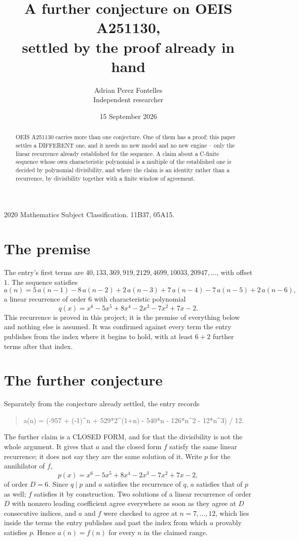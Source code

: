 \documentclass[11pt,a4paper]{article}
\title{A further conjecture on OEIS A251130,\\ \large settled by the proof already in hand}
\author{Adrian Perez Fontelles\\ \small Independent researcher}
\date{15 September 2026}
\theoremstyle{plain}
\theoremstyle{definition}
\begin{document}
\maketitle

\begin{abstract}
OEIS A251130 carries more than one conjecture. One of them has a proof; this paper settles a
DIFFERENT one, and it needs no new model and no new engine -- only the linear recurrence already
established for the sequence. A claim about a C-finite sequence whose own characteristic
polynomial is a multiple of the established one is decided by polynomial divisibility, and where
the claim is an identity rather than a recurrence, by divisibility together with a finite window
of agreement.
\end{abstract}

\noindent\small 2020 Mathematics Subject Classification. 11B37, 05A15.\normalsize

\section{The premise}

The entry's first terms are $40, 133, 369, 919, 2129, 4699, 10033, 20947,\dots$, with offset $1$. The sequence satisfies
\[
  a(n)=5\,a(n-1) - 8\,a(n-2) + 2\,a(n-3) + 7\,a(n-4) - 7\,a(n-5) + 2\,a(n-6) ,
\]
a linear recurrence of order $6$ with characteristic polynomial
\[
  q(x)=x^{6} - 5 x^{5} + 8 x^{4} - 2 x^{3} - 7 x^{2} + 7 x - 2 .
\]
This recurrence is proved in this project; it is the premise of everything below and nothing else is assumed.
It was confirmed against every term the entry publishes from the index where it begins to hold,
with at least $6+2$ further terms after that index.

\section{The further conjecture}

Separately from the conjecture already settled, the entry records

\begin{quote}\raggedright a(n) = (-957 + (-1)\^{}n + 529*2\^{}(1+n) - 540*n - 126*n\^{}2 - 12*n\^{}3) / 12.\end{quote}

The further claim is a CLOSED FORM, and for that the divisibility is not the whole argument. It
gives that $a$ and the closed form $f$ satisfy the same linear recurrence; it does not say they
are the same solution of it. Write $p$ for the annihilator of $f$,
\[
  p(x)=x^{6} - 5 x^{5} + 8 x^{4} - 2 x^{3} - 7 x^{2} + 7 x - 2 ,
\]
of order $D=6$. Since $q\mid p$ and $a$ satisfies the recurrence of $q$, $a$ satisfies that of
$p$ as well; $f$ satisfies it by construction. Two solutions of a linear recurrence of order $D$
with nonzero leading coefficient agree everywhere as soon as they agree at $D$ consecutive
indices, and $a$ and $f$ were checked to agree at $n=7,\dots,12$,
which lies inside the terms the entry publishes and past the index from which $a$ provably
satisfies $p$. Hence $a(n)=f(n)$ for every $n$ in the claimed range.
\end{document}
